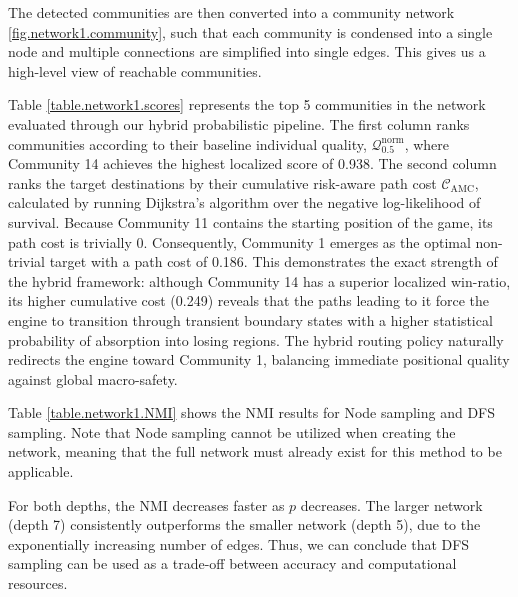 \documentclass[9pt,twocolumn,twoside]{pnas-report}
\begin{document}
The detected communities are then converted into a community network \ref{fig.network1.community}, such that each community is condensed into a single node and multiple connections are simplified into single edges. This gives us a high-level view of reachable communities.


Table \ref{table.network1.scores} represents the top 5 communities in the network evaluated through our hybrid probabilistic pipeline. The first column ranks communities according to their baseline individual quality, $\mathcal{Q}_{0.5}^{\text{norm}}$, where Community 14 achieves the highest localized score of 0.938. The second column ranks the target destinations by their cumulative risk-aware path cost $\mathcal{C}_{\text{AMC}}$, calculated by running Dijkstra's algorithm over the negative log-likelihood of survival. Because Community 11 contains the starting position of the game, its path cost is trivially 0. Consequently, Community 1 emerges as the optimal non-trivial target with a path cost of 0.186. This demonstrates the exact strength of the hybrid framework: although Community 14 has a superior localized win-ratio, its higher cumulative cost (0.249) reveals that the paths leading to it force the engine to transition through transient boundary states with a higher statistical probability of absorption into losing regions. The hybrid routing policy naturally redirects the engine toward Community 1, balancing immediate positional quality against global macro-safety.

Table \ref{table.network1.NMI} shows the NMI results for Node sampling and  DFS sampling. 
Note that Node sampling cannot be utilized when creating the network, meaning that the full network must already exist for this method to be applicable. 

For both depths, the NMI decreases faster as $p$ decreases. The larger network (depth 7) consistently outperforms the smaller network (depth 5), due to the exponentially increasing number of edges. Thus, we can conclude that DFS sampling can be used as a trade-off between accuracy and computational resources.  
\end{document}
